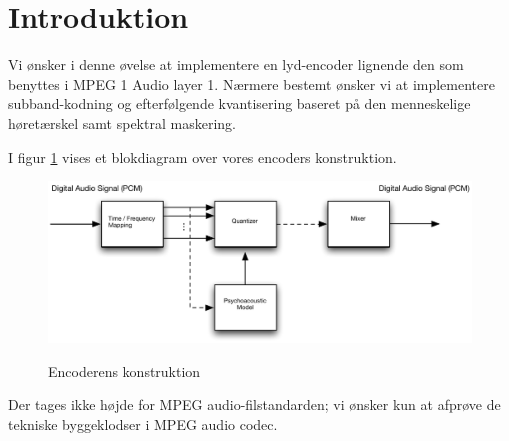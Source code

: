 \section{Introduktion}
Vi ønsker i denne øvelse at implementere en lyd-encoder lignende den som benyttes i MPEG 1 Audio layer 1. Nærmere bestemt ønsker vi at implementere subband-kodning og efterfølgende kvantisering baseret på den menneskelige høretærskel samt spektral maskering.

I figur \ref{fig.blokdiagram} vises et blokdiagram over vores encoders konstruktion.

\begin{figure}[h!]
\begin{center}
\includegraphics[width=12cm]{blokdiagram}\\
\end{center}
\label{fig.blokdiagram}
\caption{Encoderens konstruktion}
\end{figure}

Der tages ikke højde for MPEG audio-filstandarden; vi ønsker kun at afprøve de tekniske byggeklodser i MPEG audio codec.

